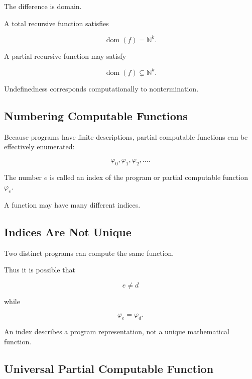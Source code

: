 The difference is domain.

A total recursive function satisfies

\[
\boxed{
\operatorname{dom}(f)
=
\mathbb{N}^k.
}
\]

A partial recursive function may satisfy

\[
\boxed{
\operatorname{dom}(f)
\subsetneq
\mathbb{N}^k.
}
\]

Undefinedness corresponds computationally to nontermination.

\subsection{Numbering Computable Functions}
\label{subsec:numbering-computable-functions}

Because programs have finite descriptions, partial computable functions can
be effectively enumerated:

\[
\boxed{
\varphi_0,
\varphi_1,
\varphi_2,
\ldots.
}
\]

The number \(e\) is called an index of the program or partial computable
function \(\varphi_e\).

A function may have many different indices.

\subsection{Indices Are Not Unique}
\label{subsec:indices-not-unique}

Two distinct programs can compute the same function.

Thus it is possible that

\[
\boxed{
e\neq d
}
\]

while

\[
\boxed{
\varphi_e
=
\varphi_d.
}
\]

An index describes a program representation, not a unique mathematical
function.

\subsection{Universal Partial Computable Function}
\label{subsec:universal-partial-computable-function}

